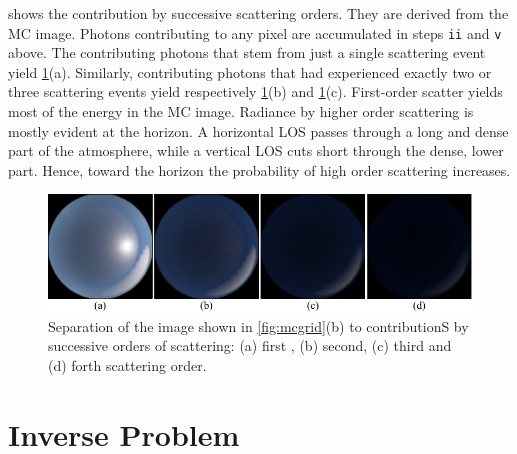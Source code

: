 \documentclass[10pt,letterpaper]{article}
\newcommand{\yoavcomment}[1]{}
\renewcommand{\yoavcomment}[1]{#1} %
\begin{document}
 shows the contribution by successive
scattering orders. They are derived from the MC image. Photons contributing
to any pixel are accumulated in steps {\tt ii} and {\tt v} above.
The contributing photons that stem from just a single scattering event yield
\cref{fig:scatter_order}(a). Similarly, contributing photons that had
experienced exactly  two or three scattering events yield respectively
\cref{fig:scatter_order}(b) and \cref{fig:scatter_order}(c). First-order
scatter yields most of the energy in the MC image. Radiance by higher order scattering
is mostly evident at the horizon. A horizontal LOS passes through a long
and dense part of the atmosphere, while a vertical LOS cuts short through
the dense, lower part. Hence, toward the horizon the probability of high
order scattering increases.
\begin{figure}[bt]
  \centering
  \yoavcomment{\includegraphics{images/scatter_order.pdf}}
  \caption{\small Separation of the image shown in \cref{fig:mcgrid}(b) to contributionS
   by successive orders of scattering: (a) first , (b) second, (c) third and (d) forth scattering order.}
  \label{fig:scatter_order}
\end{figure}


\section{Inverse Problem}
\label{sec:inverse-problem}
\end{document}
